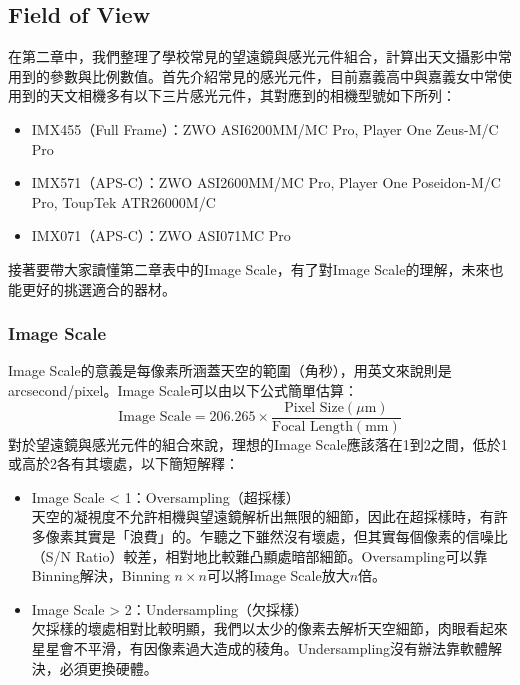 \subsection{Field of View}
在第二章中，我們整理了學校常見的望遠鏡與感光元件組合，計算出天文攝影中常用到的參數與比例數值。首先介紹常見的感光元件，目前嘉義高中與嘉義女中常使用到的天文相機多有以下三片感光元件，其對應到的相機型號如下所列：
\begin{itemize}
    \item IMX455（Full Frame）：ZWO ASI6200MM/MC Pro, Player One Zeus-M/C Pro
    \item IMX571（APS-C）：ZWO ASI2600MM/MC Pro, Player One Poseidon-M/C Pro, ToupTek ATR26000M/C
    \item IMX071（APS-C）：ZWO ASI071MC Pro
\end{itemize}
接著要帶大家讀懂第二章表中的Image Scale，有了對Image Scale的理解，未來也能更好的挑選適合的器材。
\subsubsection{Image Scale}
Image Scale的意義是每像素所涵蓋天空的範圍（角秒），用英文來說則是arcsecond/pixel。Image Scale可以由以下公式簡單估算：
\[\text{Image Scale}=206.265\times\frac{\text{Pixel Size}\left(\mu\text{m}\right)}{\text{Focal Length}\left(\text{mm}\right)}\]
對於望遠鏡與感光元件的組合來說，理想的Image Scale應該落在1到2之間，低於1或高於2各有其壞處，以下簡短解釋：
\begin{itemize}
    \item Image Scale < 1：Oversampling（超採樣）\\
        天空的凝視度不允許相機與望遠鏡解析出無限的細節，因此在超採樣時，有許多像素其實是「浪費」的。乍聽之下雖然沒有壞處，但其實每個像素的信噪比（S/N Ratio）較差，相對地比較難凸顯處暗部細節。Oversampling可以靠Binning解決，Binning \(n\times n\)可以將Image Scale放大\(n\)倍。
    \item Image Scale > 2：Undersampling（欠採樣）\\
        欠採樣的壞處相對比較明顯，我們以太少的像素去解析天空細節，肉眼看起來星星會不平滑，有因像素過大造成的稜角。Undersampling沒有辦法靠軟體解決，必須更換硬體。
\end{itemize}